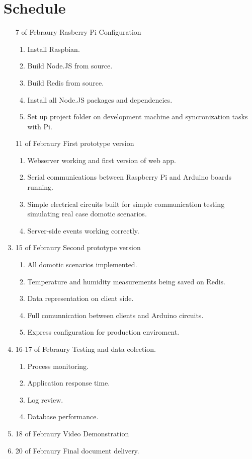 \documentclass[a4paper]{article}
\begin{document}
\section {Schedule}


\begin{enumerate}
  \item[7 of Febraury] Rasberry Pi Configuration
  \begin{enumerate}
  	\item Install Raspbian.
    \item Build Node.JS from source.
    \item Build Redis from source.
    \item Install all Node.JS packages and dependencies.
    \item Set up project folder on development machine and syncronization tasks with Pi.
  \end{enumerate}
  \item[11 of Febraury] First prototype version
  \begin {enumerate}
  	\item Webserver working and first version of web app.
    \item Serial communications between Raspberry Pi and Arduino boards running.
    \item Simple electrical circuits built for simple communication testing simulating real case domotic scenarios.
    \item Server-side events working correctly.
  \end{enumerate}
  \item [15 of Febraury] Second prototype version
  \begin {enumerate}
  	\item All domotic scenarios implemented.
    \item Temperature and humidity measurements being saved on Redis.
    \item Data representation on client side.
    \item Full comunnication between clients and Arduino circuits.
    \item Express configuration for production enviroment.
  \end{enumerate}
  \item[16-17 of Febraury] Testing and data colection.
    \begin {enumerate}
  	\item Process monitoring.
    \item Application response time.
    \item Log review.
    \item Database performance.
  \end{enumerate}
  \item[18 of Febraury] Video Demonstration
  \item[20 of Febraury] Final document delivery.
\end{enumerate}
\end{document}
